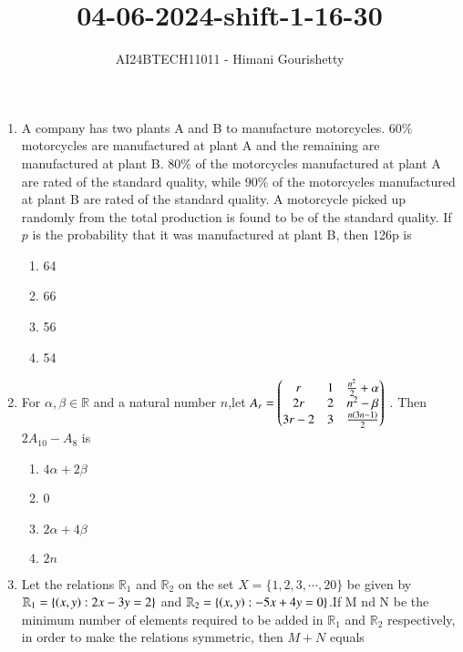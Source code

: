 \documentclass[journal,12pt,onecolumn]{IEEEtran}
\theoremstyle{remark}
\begin{document}

\vspace{3cm}

\title{04-06-2024-shift-1-16-30}
\author{AI24BTECH11011 - Himani Gourishetty}
\maketitle
\bigskip

\renewcommand{\thefigure}{\theenumi}
\renewcommand{\thetable}{\theenumi}
\begin{enumerate}
    \item A company has two plants A and B to manufacture motorcycles. $60\%$ motorcycles are manufactured at plant A and the remaining are manufactured at plant B. $80\%$ of the motorcycles manufactured at plant A are rated of the standard quality, while $90\%$ of the motorcycles manufactured at plant B are rated of the standard quality. A motorcycle picked up randomly from the total production is found to be of the standard quality. If $p$ is the probability that it was manufactured at plant B, then 126p is
    \begin{enumerate}
        \item 64
        \item 66
        \item 56
        \item 54
    \end{enumerate}
    \item For $\alpha,\beta \in \mathbb{R}$ and a natural number $n$,let $A_r=\begin{pmatrix}r & 1 & \frac{n^2}{2}+\alpha \\ 2r & 2 & n^2-\beta \\ 3r-2 & 3 &\frac{n\left(3n-1\right)}{2}\end{pmatrix}$ . Then $2A_{10}-A_8$ is
    \begin{enumerate}
        \item $4\alpha+2\beta$
        \item 0
        \item $2\alpha+4\beta$
        \item $2n$
    \end{enumerate}
    \item Let the relations $\mathbb{R}_1$ and $\mathbb{R}_2$ on the set $X=\{1,2,3,\cdots,20\}$ be given by $\mathbb{R}_1=\left\{\left(x,y\right):2x-3y=2\right\}$ and $\mathbb{R}_2=\left\{\left(x,y\right):-5x+4y=0\right\}$.If M nd N be the minimum number of elements required to be added in $\mathbb{R}_1$ and $\mathbb{R}_2$ respectively, in order to make the relations symmetric, then $M+N$ equals
    \begin{enumerate}

\end{enumerate}
\end{enumerate}
\end{document}
